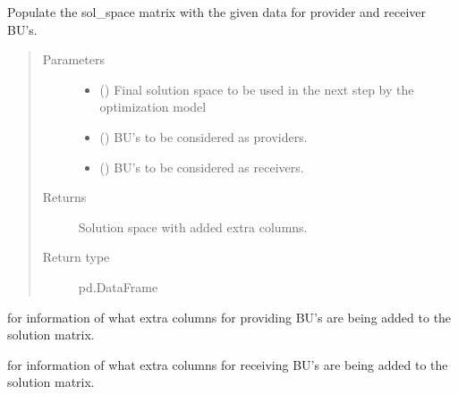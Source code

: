 \documentclass[letterpaper,10pt,english]{sphinxmanual}
\begin{document}
\begin{fulllineitems}
\begin{fulllineitems}
\label{\detokenize{source/optimization:optimization.solspace.SolutionSpace._populate_matrix}}
Populate the sol\_space matrix with the given data for provider and receiver BU’s.
\begin{quote}\begin{description}
\item[{Parameters}] \leavevmode\begin{itemize}
\item {} 
 () \textendash{} Final solution space to be used in the next step
by the optimization model

\item {} 
 () \textendash{} BU’s to be considered as providers.

\item {} 
 () \textendash{} BU’s to be considered as receivers.

\end{itemize}

\item[{Returns}] \leavevmode
{} \textendash{} Solution space with added extra columns.

\item[{Return type}] \leavevmode
pd.DataFrame

\end{description}\end{quote}




 for information of what extra columns for providing BU’s
are being added to the solution matrix.

 for information of what extra columns for receiving BU’s
are being added to the solution matrix.


\end{fulllineitems}
\end{fulllineitems}
\end{document}
